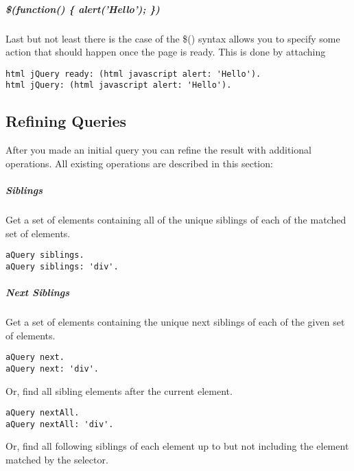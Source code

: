 \documentclass[a4paper,10pt,twoside]{book}
\newcommand{\ct}[1]{{\small\ttfamily\textup{#1}}}
\begin{document}
\subparagraph*{ \$(function() \{ alert('Hello'); \})}
\label{book:web20:jquery:basics:creatingqueries:157268653}
 Last but not least there is the case of the \ct{\$()} syntax allows you to specify some action that should happen once the page is ready. This is done by attaching

\begin{lstlisting}
html jQuery ready: (html javascript alert: 'Hello').
html jQuery: (html javascript alert: 'Hello').
\end{lstlisting}

\subsection{Refining Queries}
\label{book:web20:jquery:basics:refiningqueries}

After you made an initial query you can refine the result with additional operations. All existing operations are described in this section:

\subparagraph*{Siblings}
\label{book:web20:jquery:basics:refiningqueries:163076238}
  Get a set of elements containing all of the unique siblings of each of the matched set of elements.

\begin{lstlisting}
aQuery siblings.
aQuery siblings: 'div'.
\end{lstlisting}

\subparagraph*{Next Siblings}
\label{book:web20:jquery:basics:refiningqueries:63025585}
  Get a set of elements containing the unique next siblings of each of the given set of elements.

\begin{lstlisting}
aQuery next.
aQuery next: 'div'.
\end{lstlisting}

  Or, find all sibling elements after the current element.

\begin{lstlisting}
aQuery nextAll.
aQuery nextAll: 'div'.
\end{lstlisting}

 Or, find all following siblings of each element up to but not including the element matched by the selector.
\end{document}
